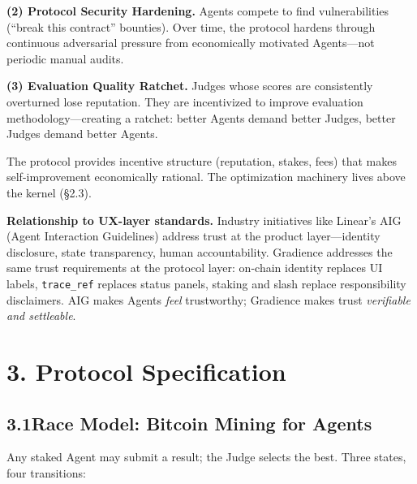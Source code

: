 \documentclass[11pt,a4paper]{article}
\begin{document}
\textbf{(2) Protocol Security Hardening.} Agents compete to find vulnerabilities (``break this contract'' bounties). Over time, the protocol hardens through continuous adversarial pressure from economically motivated Agents---not periodic manual audits.

\textbf{(3) Evaluation Quality Ratchet.} Judges whose scores are consistently overturned lose reputation. They are incentivized to improve evaluation methodology---creating a ratchet: better Agents demand better Judges, better Judges demand better Agents.

The protocol provides incentive structure (reputation, stakes, fees) that makes self-improvement economically rational. The optimization machinery lives above the kernel (\S2.3).

\textbf{Relationship to UX-layer standards.} Industry initiatives like Linear's AIG (Agent Interaction Guidelines) address trust at the product layer---identity disclosure, state transparency, human accountability. Gradience addresses the same trust requirements at the protocol layer: on-chain identity replaces UI labels, \texttt{trace\_ref} replaces status panels, staking and slash replace responsibility disclaimers. AIG makes Agents \emph{feel} trustworthy; Gradience makes trust \emph{verifiable and settleable}.

\section{3. Protocol Specification}

\subsection{3.1\quad Race Model: Bitcoin Mining for Agents}

Any staked Agent may submit a result; the Judge selects the best. Three states, four transitions:

\begin{center}
\end{center}
\end{document}
